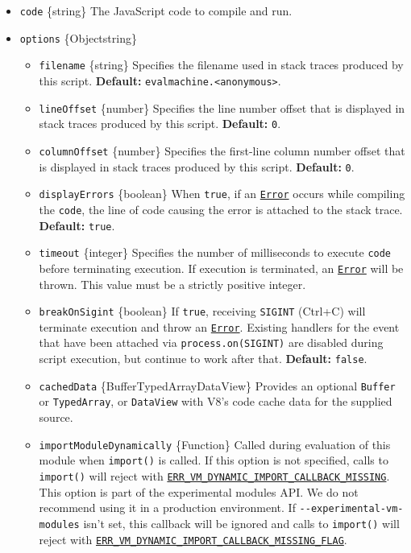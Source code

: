 \begin{itemize}
\tightlist
\item
  \texttt{code} \{string\} The JavaScript code to compile and run.
\item
  \texttt{options} \{Object\textbar string\}

  \begin{itemize}
  \tightlist
  \item
    \texttt{filename} \{string\} Specifies the filename used in stack
    traces produced by this script. \textbf{Default:}
    \texttt{\textquotesingle{}evalmachine.\textless{}anonymous\textgreater{}\textquotesingle{}}.
  \item
    \texttt{lineOffset} \{number\} Specifies the line number offset that
    is displayed in stack traces produced by this script.
    \textbf{Default:} \texttt{0}.
  \item
    \texttt{columnOffset} \{number\} Specifies the first-line column
    number offset that is displayed in stack traces produced by this
    script. \textbf{Default:} \texttt{0}.
  \item
    \texttt{displayErrors} \{boolean\} When \texttt{true}, if an
    \href{errors.md\#class-error}{\texttt{Error}} occurs while compiling
    the \texttt{code}, the line of code causing the error is attached to
    the stack trace. \textbf{Default:} \texttt{true}.
  \item
    \texttt{timeout} \{integer\} Specifies the number of milliseconds to
    execute \texttt{code} before terminating execution. If execution is
    terminated, an \href{errors.md\#class-error}{\texttt{Error}} will be
    thrown. This value must be a strictly positive integer.
  \item
    \texttt{breakOnSigint} \{boolean\} If \texttt{true}, receiving
    \texttt{SIGINT} (Ctrl+C) will terminate execution and throw an
    \href{errors.md\#class-error}{\texttt{Error}}. Existing handlers for
    the event that have been attached via
    \texttt{process.on(\textquotesingle{}SIGINT\textquotesingle{})} are
    disabled during script execution, but continue to work after that.
    \textbf{Default:} \texttt{false}.
  \item
    \texttt{cachedData} \{Buffer\textbar TypedArray\textbar DataView\}
    Provides an optional \texttt{Buffer} or \texttt{TypedArray}, or
    \texttt{DataView} with V8's code cache data for the supplied source.
  \item
    \texttt{importModuleDynamically} \{Function\} Called during
    evaluation of this module when \texttt{import()} is called. If this
    option is not specified, calls to \texttt{import()} will reject with
    \href{errors.md\#err_vm_dynamic_import_callback_missing}{\texttt{ERR\_VM\_DYNAMIC\_IMPORT\_CALLBACK\_MISSING}}.
    This option is part of the experimental modules API. We do not
    recommend using it in a production environment. If
    \texttt{-\/-experimental-vm-modules} isn't set, this callback will
    be ignored and calls to \texttt{import()} will reject with
    \href{errors.md\#err_vm_dynamic_import_callback_missing_flag}{\texttt{ERR\_VM\_DYNAMIC\_IMPORT\_CALLBACK\_MISSING\_FLAG}}.


\end{itemize}
\end{itemize}
